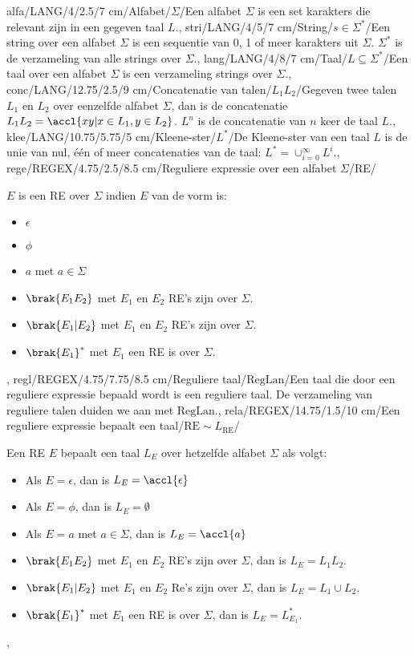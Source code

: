 alfa/LANG/4/2.5/7 cm/Alfabet/{$\Sigma$}/{Een alfabet $\Sigma$ is een set karakters die relevant zijn in een gegeven taal $L$.},
stri/LANG/4/5/7 cm/String/{$s\in\Sigma^*$}/{Een string over een alfabet $\Sigma$ is een sequentie van 0, 1 of meer karakters uit $\Sigma$. $\Sigma^*$ is de verzameling van alle strings over $\Sigma$.},
lang/LANG/4/8/7 cm/Taal/{$L\subseteq\Sigma^*$}/{Een taal over een alfabet $\Sigma$ is een verzameling strings over $\Sigma$.},
conc/LANG/12.75/2.5/9 cm/Concatenatie van talen/{$L_1L_2$}/{Gegeven twee talen $L_1$ en $L_2$ over eenzelfde alfabet $\Sigma$, dan is de concatenatie $L_1L_2=\accl{xy|x\in L_1,y\in L_2}$. $L^n$ is de concatenatie van $n$ keer de taal $L$.},
klee/LANG/10.75/5.75/5 cm/Kleene-ster/{$L^*$}/{De Kleene-ster van een taal $L$ is de unie van nul, \'e\'en of meer concatenaties van de taal: $L^*=\displaystyle\cup_{i=0}^{\infty}{L^i}$.},
rege/REGEX/4.75/2.5/8.5 cm/Reguliere expressie over een alfabet $\Sigma$/RE/{$E$ is een RE over $\Sigma$ indien $E$ van de vorm is:\begin{itemize}
 \item $\epsilon$
 \item $\phi$
 \item $a$ met $a\in\Sigma$
 \item $\brak{E_1E_2}$ met $E_1$ en $E_2$ RE's zijn over $\Sigma$.
 \item $\brak{E_1|E_2}$ met $E_1$ en $E_2$ RE's zijn over $\Sigma$.
 \item $\brak{E_1}^*$ met $E_1$ een RE is over $\Sigma$.
\end{itemize}},
regl/REGEX/4.75/7.75/8.5 cm/Reguliere taal/$\mbox{RegLan}$/{Een taal die door een reguliere expressie bepaald wordt is een reguliere taal. De verzameling van reguliere talen duiden we aan met $\mbox{RegLan}$.},
rela/REGEX/14.75/1.5/10 cm/Een reguliere expressie bepaalt een taal/$\mbox{RE}\sim L_{\mbox{RE}}$/{Een RE $E$ bepaalt een taal $L_E$ over hetzelfde alfabet $\Sigma$ als volgt:\begin{itemize}
 \item Als $E=\epsilon$, dan is $L_E=\accl{\epsilon}$
 \item Als $E=\phi$, dan is $L_E=\emptyset$
 \item Als $E=a$ met $a\in\Sigma$, dan is $L_E=\accl{a}$
 \item $\brak{E_1E_2}$ met $E_1$ en $E_2$ RE's zijn over $\Sigma$, dan is $L_E=L_1L_2$.
 \item $\brak{E_1|E_2}$ met $E_1$ en $E_2$ Re's zijn over $\Sigma$, dan is $L_E=L_1\cup L_2$.
 \item $\brak{E_1}^*$ met $E_1$ een RE is over $\Sigma$, dan is $L_E=L_{E_1}^*$.
\end{itemize}},
